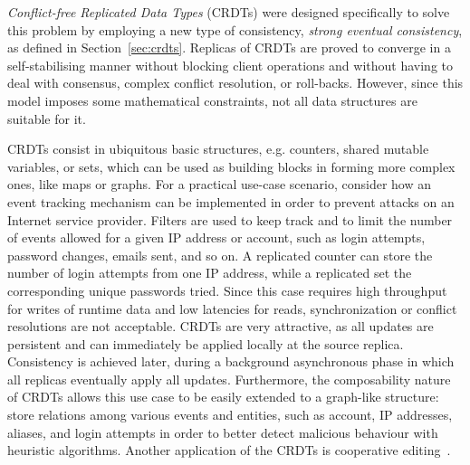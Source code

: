 \textit{Conflict-free Replicated Data Types} (CRDTs) were designed specifically
to solve this problem by employing a new type of consistency, \textit{strong
eventual consistency}, as defined in Section~\ref{sec:crdts}. Replicas of CRDTs
are proved to converge in a self-stabilising manner without blocking client
operations and without having to deal with consensus, complex conflict
resolution, or roll-backs. However, since this model imposes some mathematical
constraints, not all data structures are suitable for it.

CRDTs consist in ubiquitous basic structures, e.g. counters, shared mutable
variables, or sets, which can be used as building blocks in forming more complex
ones, like maps or graphs. For a practical use-case scenario, consider how an
event tracking mechanism can be implemented in order to prevent attacks on an
Internet service provider. Filters are used to keep track and to limit the
number of events allowed for a given IP address or account, such as login
attempts, password changes, emails sent, and so on. A replicated counter can
store the number of login attempts from one IP address, while a replicated set
the corresponding unique passwords tried. Since this case requires high
throughput for writes of runtime data and low latencies for reads,
synchronization or conflict resolutions are not acceptable. CRDTs are very
attractive, as all updates are persistent and can immediately be applied locally
at the source replica. Consistency is achieved later, during a background
asynchronous phase in which all replicas eventually apply all updates.
Furthermore, the composability nature of CRDTs allows this use case to be easily
extended to a graph-like structure: store relations among various events and
entities, such as account, IP addresses, aliases, and login attempts in order to
better detect malicious behaviour with heuristic algorithms. Another application
of the CRDTs is cooperative editing~\cite{Preguica:2009:CRD:1584339.1584604}.

